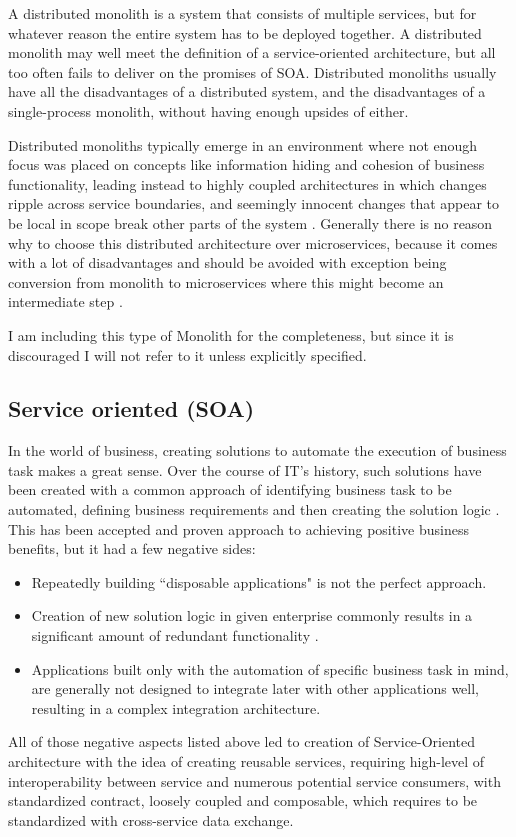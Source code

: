 A distributed monolith is a system that consists of multiple services, but for whatever reason the entire system has to be deployed together. A distributed monolith may well meet the definition of a service-oriented architecture, but all too often fails to deliver on the promises of SOA. Distributed monoliths usually have all the disadvantages of a distributed system, and the disadvantages of a single-process monolith, without having enough upsides of either. \cite{MON_TO_MS_MONOLITH}

Distributed monoliths typically emerge in an environment where not enough focus was placed on concepts like information hiding and cohesion of business functionality, leading instead to highly coupled architectures in which changes ripple across service boundaries, and seemingly innocent changes that appear to be local in scope break other parts of the system \cite{MON_TO_MS_MONOLITH}. Generally there is no reason why to choose this distributed architecture over microservices, because it comes with a lot of disadvantages and should be avoided with exception being conversion from monolith to microservices where this might become an intermediate step \cite{DIST_MON_WHICH_BUILDING}.

I am including this type of Monolith for the completeness, but since it is discouraged I will not refer to it unless explicitly specified.

\subsection{Service oriented (SOA)}
In the world of business, creating solutions to automate the execution of business task makes a great sense. Over the course of IT's history, such solutions have been created with a common approach of identifying business task to be automated, defining business requirements and then creating the solution logic \cite{SERVICE_ORIENTED_ARCHITECTURE}. This has been accepted and proven approach to achieving positive business benefits, but it had a few negative sides:
\begin{itemize}
    \item  Repeatedly building ``disposable applications" is not the perfect approach.
    \item  Creation of new solution logic in given enterprise commonly results in a significant amount of redundant functionality \cite{SERVICE_ORIENTED_ARCHITECTURE}.
    \item Applications built only with the automation of specific business task in mind, are generally not designed to integrate later with other applications well, resulting in a complex integration architecture.
\end{itemize}
All of those negative aspects listed above led to creation of Service-Oriented architecture with the idea of creating reusable services, requiring high-level of interoperability between service and numerous potential service consumers, with standardized contract, loosely coupled and composable, which requires to be standardized with cross-service data exchange.

